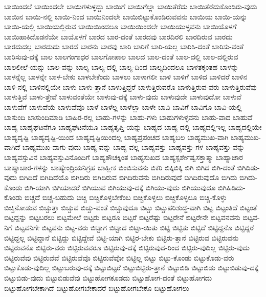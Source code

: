 {ಬಾಯಿಂದಲೆ
ಬಾಯಿಂದಲೇ
ಬಾಯಿಗಳುಳ್ಳದ್ದು
ಬಾಯಿಗೆ
ಬಾಯಿಗೆಲ್ಲಾ
ಬಾಯಿತೆರೆದು
ಬಾಯಿತೆರೆದುಕೊಂಡಿರು-ವುದು
ಬಾಯಿನ
ಬಾಯಿ-ನಲ್ಲಿ
ಬಾಯಿ-ನಿಂದ
ಬಾಯಿನಿಂದಲೇ
ಬಾಯಿಬಿಟ್ಟುಕೊಂಡಿರುವವನು
ಬಾಯಿಯ
ಬಾಯಿ-ಯನ್ನು
ಬಾಯಿ-ಯಲ್ಲಿ
ಬಾಯಿಯಲ್ಲಿರುವ
ಬಾಯಿಯಿಂದಲೂ
ಬಾಯಿಯಿಂದಲೇ
ಬಾಯಿಯುಳ್ಳವನು
ಬಾಯಿಯೊಳಗೆ
ಬಾಯಿಹಾಕಿದೊಡನೆಯೇ
ಬಾಯೊಳಗೆ
ಬಾರದ
ಬಾರ-ದಂತೆ
ಬಾರದವು
ಬಾರದಿರಲಿ
ಬಾರದಿರುವ
ಬಾರದು
ಬಾರದುದಲ್ಲ
ಬಾರದುದು
ಬಾರದೆ
ಬಾರನು
ಬಾರವು
ಬಾರಿ
ಬಾರಿಗೆ
ಬಾರಿ-ಯಲ್ಲ
ಬಾರಿಸಿ-ದಂತೆ
ಬಾರಿಸು-ವಂತೆ
ಬಾರಿಸುವು-ದಕ್ಕೆ
ಬಾಲ
ಬಾಲಗಂಗಾಧರ
ಬಾಲಗೋಪಾಲ
ಬಾಲದ
ಬಾಲ-ದಂತೆ
ಬಾಲ-ದಲ್ಲಿ
ಬಾಲ-ದಲ್ಲಿರುವ
ಬಾಲಲೀಲೆ-ಯನ್ನು
ಬಾಲ-ವನ್ನು
ಬಾಲ್ಯ
ಬಾಲ್ಯ-ದಲ್ಲಿ
ಬಾಲ್ಯ-ದಿಂದ
ಬಾಲ್ಯದಿಂದಲೂ
ಬಾಳತಕ್ಕಂತಹ
ಬಾಳನ್ನು
ಬಾಳನ್ನೆಲ್ಲ
ಬಾಳನ್ನೇ
ಬಾಳ-ಬೇಕು
ಬಾಳಬೇಕೆಂದು
ಬಾಳಲು
ಬಾಳಾಗಲೀ
ಬಾಳಿ
ಬಾಳಿಗೆ
ಬಾಳಿದ
ಬಾಳಿದರೆ
ಬಾಳಿನ
ಬಾಳಿ-ನಲ್ಲಿ
ಬಾಳಿನಲ್ಲಿಯೇ
ಬಾಳು
ಬಾಳು-ತ್ತಾನೆ
ಬಾಳುತ್ತಿದ್ದರೆ
ಬಾಳುತ್ತಿರುವರೊ
ಬಾಳುತ್ತಿರುವ-ವರು
ಬಾಳುತ್ತಿರುವೆವು
ಬಾಳುತ್ತಿವೆ
ಬಾಳು-ತ್ತೇವೆ
ಬಾಳುವಂತೆಯೇ
ಬಾಳುವು-ದಕ್ಕೆ
ಬಾಳು-ವುದು
ಬಾಳುವುದೇ
ಬಾಳುವುದೋ
ಬಾಳುವೆ
ಬಾಳುವೆಗೆ
ಬಾಳುವೆಯೆ
ಬಾಳುವೆವೊ
ಬಾಳೆ
ಬಾಳೆಲ್ಲ
ಬಾಳೆಲ್ಲಾ
ಬಾಳೇ
ಬಾವಿ
ಬಾವಿಗೆ
ಬಾವಿಗೊ
ಬಾವಿ-ಯಲ್ಲಿ
ಬಾಸುಂದಿ
ಬಾಸುಂದಿಮಾಡಿ
ಬಾಹಿರ-ರಲ್ಲ
ಬಾಹು-ಗಳನ್ನು
ಬಾಹು-ಗಳು
ಬಾಹುಗಳುಳ್ಳವನು
ಬಾಹು-ವಾದ
ಬಾಹುವೆ
ಬಾಹ್ಯ
ಬಾಹ್ಯಘಟನೆಗೂ
ಬಾಹ್ಯಘಟನೆಯೂ
ಬಾಹ್ಯತೃಪ್ತಿ-ಯನ್ನು
ಬಾಹ್ಯದ
ಬಾಹ್ಯ-ದಲ್ಲಿ
ಬಾಹ್ಯದಲ್ಲಿಇಲ್ಲ
ಬಾಹ್ಯದಲ್ಲಿಯೇ
ಬಾಹ್ಯದೃಷ್ಟಿ
ಬಾಹ್ಯದೃಷ್ಟಿ-ಯಿಂದ
ಬಾಹ್ಯದೃಷ್ಟಿಯಿಂದಲ್ಲ
ಬಾಹ್ಯಪ್ರಪಂಚದ
ಬಾಹ್ಯಬಲ
ಬಾಹ್ಯಮುಖ-ವಾಗಿ
ಬಾಹ್ಯಮುಖ-ವಾಗಿದೆ
ಬಾಹ್ಯಮುಖ-ವಾಗು-ವುದು
ಬಾಹ್ಯ-ವನ್ನು
ಬಾಹ್ಯ-ವಲ್ಲ
ಬಾಹ್ಯವಸ್ತು
ಬಾಹ್ಯವಸ್ತು-ಗಳ
ಬಾಹ್ಯವಸ್ತು-ವನ್ನು
ಬಾಹ್ಯವಸ್ತುವಿನ
ಬಾಹ್ಯವಸ್ತುವಿನೊಂದಿಗೆ
ಬಾಹ್ಯಶೌಚಕ್ಕಿಂತ
ಬಾಹ್ಯಸುಖದ
ಬಾಹ್ಯಸ್ಪರ್ಶೇಷ್ವಸಕ್ತಾತ್ಮಾ
ಬಾಹ್ಯಾಚಾರ
ಬಾಹ್ಯಾಚಾರ-ಗಳನ್ನು
ಬಾಹ್ಯೇಂದ್ರಿಯನಿಗ್ರಹ
ಬಾಹ್ಲೀಕ
ಬಿಂಬಿಸುವನು
ಬಿಕರಿ
ಬಿಕ್ಕಿಬಿಕ್ಕಿ
ಬಿಗಿ
ಬಿಗಿದ
ಬಿಗಿ-ದಂತೆ
ಬಿಗಿದಿಡು-ವುದು
ಬಿಗಿದಿದೆ
ಬಿಗಿದಿದೆಯೊ
ಬಿಗಿದಿರು
ಬಿಗಿದಿರುವ
ಬಿಗಿದಿರುವನು
ಬಿಗಿದಿರುವುದೆ
ಬಿಗಿದಿರುವುದೊ
ಬಿಗಿದು
ಬಿಗಿದು-ಕೊಂಡು
ಬಿಗಿ-ಯಾಗಿ
ಬಿಗಿಯಾದರೆ
ಬಿಗಿಯುವ
ಬಿಗಿಯುವು-ದಕ್ಕೆ
ಬಿಗಿಯು-ವುದು
ಬಿಗಿಯುವುದೂ
ಬಿಗಿಹಿಡಿದು-ಕೊಂಡು
ಬಿಚ್ಚದೆ
ಬಿಚ್ಚ-ಬಹುದು
ಬಿಚ್ಚಿ
ಬಿಚ್ಚಿಕೊಳ್ಳಬೇಕೆಂಬ
ಬಿಚ್ಚಿಕೊಳ್ಳಲು
ಬಿಚ್ಚಿಕೊಳ್ಳಲೂ
ಬಿಚ್ಚಿ-ಕೊಳ್ಳು
ಬಿಚ್ಚಿನೋಡುವ
ಬಿಚ್ಚುತ್ತಾ
ಬಿಚ್ಚುವ
ಬಿಚ್ಚು-ವಂತೆ
ಬಿಚ್ಚುವುದೂ
ಬಿಟ್ಚು
ಬಿಟ್ಚುಪರಿಶುದ್ಧ-ವಾಗಿ
ಬಿಟ್ಟ
ಬಿಟ್ಟಂತಿದೆ
ಬಿಟ್ಟಂತೆ
ಬಿಟ್ಟದ್ದನ್ನು
ಬಿಟ್ಟಬರಲು
ಬಿಟ್ಟಮೇಲೆ
ಬಿಟ್ಟರು
ಬಿಟ್ಟರೂ
ಬಿಟ್ಟರೆ
ಬಿಟ್ಟರೆಷ್ಟು
ಬಿಟ್ಟರೇನೆ
ಬಿಟ್ಟರೇನೇ
ಬಿಟ್ಟವನವನು
ಬಿಟ್ಟವ-ನಿಗೆ
ಬಿಟ್ಟವನಿಗೇ
ಬಿಟ್ಟವನು
ಬಿಟ್ಟ-ವರು
ಬಿಟ್ಟಾಗ
ಬಿಟ್ಟಾದ
ಬಿಟ್ಟಾ-ಯಿತು
ಬಿಟ್ಟಿ
ಬಿಟ್ಟಿತು
ಬಿಟ್ಟಿದೆ
ಬಿಟ್ಟಿದ್ದನೊ
ಬಿಟ್ಟಿದ್ದರೆ
ಬಿಟ್ಟಿದ್ದಲ್ಲ
ಬಿಟ್ಟಿದ್ದಾನೆ
ಬಿಟ್ಟಿದ್ದು
ಬಿಟ್ಟಿದ್ದೇವೆ
ಬಿಟ್ಟಿ-ಯಾಗಿ
ಬಿಟ್ಟಿರ-ಬೇಕು
ಬಿಟ್ಟಿರು-ತ್ತಾನೆ
ಬಿಟ್ಟಿರುವ
ಬಿಟ್ಟಿರುವನು
ಬಿಟ್ಟಿರುವನೊ
ಬಿಟ್ಟಿರು-ವರು
ಬಿಟ್ಟಿರುವವರೂ
ಬಿಟ್ಟಿರುವು-ದಕ್ಕೆ
ಬಿಟ್ಟಿರುವುದ-ರಿಂದ
ಬಿಟ್ಟಿರು-ವುದಿಲ್ಲ
ಬಿಟ್ಟಿರು-ವುದು
ಬಿಟ್ಟಿರುವೆವು
ಬಿಟ್ಟಿರುವೆವೆ
ಬಿಟ್ಟಿರುವೆವೊ
ಬಿಟ್ಟಿರುವೆವೋ
ಬಿಟ್ಟಿಲ್ಲ
ಬಿಟ್ಟು
ಬಿಟ್ಟು-ಕೊಂಡು
ಬಿಟ್ಟುಕೊಡು-ವರು
ಬಿಟ್ಟುಕೊಡು-ವುದಿಲ್ಲ
ಬಿಟ್ಟುಬರುವು-ದಕ್ಕೆ
ಬಿಟ್ಟುಬಿಟ್ಟರೆ
ಬಿಟ್ಟುಬಿಟ್ಟಿರು-ತ್ತಾನೆ
ಬಿಟ್ಟುಬಿಡಿ
ಬಿಟ್ಟುಬಿಡು
ಬಿಟ್ಟುಬಿಡುವು-ದಕ್ಕೆ
ಬಿಟ್ಟುಬಿಡು-ವುದು
ಬಿಟ್ಟುಬಿಡುವೆವು
ಬಿಟ್ಟುಹೋಗಕೂಡದು
ಬಿಟ್ಟುಹೋಗ-ದಂತೆ
ಬಿಟ್ಟುಹೋಗದು
ಬಿಟ್ಟುಹೋಗಬೇಕಾಗಿದೆ
ಬಿಟ್ಟುಹೋಗಬೇಕಾದರೆ
ಬಿಟ್ಟುಹೋಗಬೇಕೊ
ಬಿಟ್ಟುಹೋಗಲು
}
